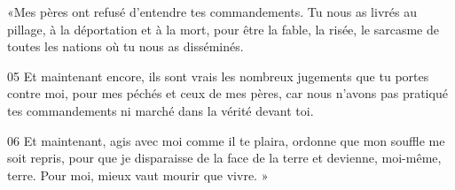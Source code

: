 «Mes pères ont refusé d’entendre tes commandements. Tu nous as livrés au pillage, à la déportation et à la mort, pour être la fable, la risée, le sarcasme de toutes les nations où tu nous as disséminés.

05 Et maintenant encore, ils sont vrais les nombreux jugements que tu portes contre moi, pour mes péchés et ceux de mes pères, car nous n’avons pas pratiqué tes commandements ni marché dans la vérité devant toi.

06 Et maintenant, agis avec moi comme il te plaira, ordonne que mon souffle me soit repris, pour que je disparaisse de la face de la terre et devienne, moi-même, terre. Pour moi, mieux vaut mourir que vivre. »